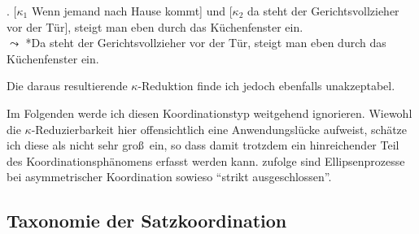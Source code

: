 \ex. \label{ex-ak-1} [$\kappa_1$ Wenn jemand nach Hause kommt] und [$\kappa_2$ da steht der Gerichtsvollzieher vor der Tür], steigt man eben durch das Küchenfenster ein. \\
$\leadsto$ *Da steht der Gerichtsvollzieher vor der Tür, steigt man eben durch das Küchenfenster ein.

Die daraus resultierende $\kappa$-Reduktion finde ich jedoch ebenfalls unakzeptabel.

Im Folgenden werde ich diesen Koordinationstyp weitgehend ignorieren. Wiewohl die $\kappa$-Reduzierbarkeit hier offensichtlich eine Anwendungslücke aufweist, schätze ich diese als nicht sehr gro\ss\ ein, so dass damit trotzdem ein hinreichender Teil des Koordinationsphänomens erfasst werden kann. \citet[(173)]{Reich:09} zufolge sind Ellipsenprozesse bei asymmetrischer Koordination sowieso "`strikt ausgeschlossen"'.


\subsection{Taxonomie der Satzkoordination}

